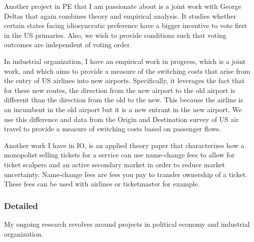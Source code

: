 \documentclass[12pt]{article}
\theoremstyle{plain}
\theoremstyle{plain}
\theoremstyle{plain}
\theoremstyle{plain}
\theoremstyle{plain}
\theoremstyle{plain}
\begin{document}
Another project in PE that I am passionate about is a joint work with George Deltas that again combines theory and empirical analysis.
It studies whether certain states facing idiosyncratic preference have a bigger incentive to vote first in the US primaries.
Also, we wish to provide conditions such that voting outcomes are independent of voting order. 

In industrial organization, I have an empirical work in progress, which is a joint work, and which aims to provide a measure of the switching costs that arise from the entry of US airlines into new airports.
Specifically, it leverages the fact that for these new routes, the direction from the new airport to the old airport is different than the direction from the old to the new.
This because the airline is an incumbent in the old airport but it is a new entrant in the new airport.
We use this difference and data from the Origin and Destination survey of US air travel to provide a measure of switching costs based on passenger flows.

Another work I have in IO, is an applied theory paper that characterizes how a monopolist selling tickets for a service
can use name-change fees to allow for ticket scalpers and an active secondary market in order to reduce market uncertainty.
Name-change fees are fees you pay to transfer ownership of a ticket.
These fees can be used with airlines or ticketmaster for example.



\subsubsection{Detailed}
\label{sec:orge239056}
My ongoing research revolves around projects in political economy and industrial organization.
\end{document}
